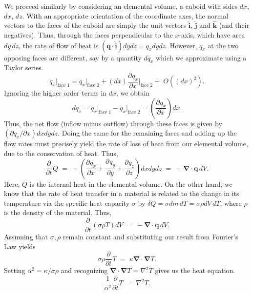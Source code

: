 \documentclass[10pt]{article}
\newcommand\ve[1]{\boldsymbol{#1}}
\newcommand\ppt[1]{\frac{\partial #1}{\partial t}}
\newcommand\pp[3][]{\frac{\partial^{#1}{#2}}{\partial {#3}^{#1}}}
\newcommand\grad[1]{\ve{\nabla}#1}
\newcommand\divg[1]{\ve{\nabla}\cdot#1}
\newcommand\lapl[1]{\nabla^2 #1}
\begin{document}
        We proceed similarly by considering an elemental volume, a cuboid with sides $dx$, $dx$, $dz$. With an appropriate orientation
        of the coordinate axes, the normal vectors to the faces of the cuboid are simply the unit vectors $\ve{\hat{i}}$, $\ve{\hat{j}}$
        and $\ve{\hat{k}}$ (and their negatives). Thus, through the faces perpendicular to the $x$-axis, which have area $dy\,dz$,
        the rate of flow of heat is $(\ve{q}\cdot\ve{\hat{i}})dydz = q_x dy dz$. However, $q_x$ at the two opposing faces are different,
        say by a quantity $dq_x$ which we approximate using a Taylor series.
        \[
                q_x\big|_{\text{face 1}} = q_x\big|_{\text{face 2}} + (dx)\pp{q_x}{x}\bigg|_{\text{face 2}} +\; O((dx)^2).
        \]
        Ignoring the higher order terms in $dx$, we obtain
        \[
                dq_x = q_x\big|_{\text{face 1}} - q_x\big|_{\text{face 2}} = \left(\pp{q_x}{x}\right)dx.
        \]
        Thus, the net flow (inflow minus outflow) through these faces is given by $(\partial q_x /\partial x)dxdydz$.
        Doing the same for the remaining faces and adding up the flow rates must precisely yield the rate of loss of heat from our elemental volume,
        due to the conservation of heat. Thus,
        \[
                \pp{}{t}Q \;=\; -\left(\pp{q_x}{x} + \pp{q_y}{y} + \pp{q_z}{z}\right)dx dy dz \;=\; -\divg{\ve{q}}\, dV.
        \]
        Here, $Q$ is the internal heat in the elemental volume. On the other hand, we know that the rate of heat transfer in a material is related to the
        change in its temperature via the specific heat capacity $\sigma$ by $\delta Q = \sigma d m\, dT = \sigma\rho dV\, dT$, where $\rho$
        is the density of the material. Thus,
        \[
                \pp{}{t}(\sigma \rho T) dV \;=\; -\divg{\ve{q}}\, dV.
        \]
        Assuming that $\sigma, \rho$ remain constant and substituting our result from Fourier's Law yields
        \[
                \sigma\rho\pp{}{t}T \;=\; \kappa\divg{\grad{T}}.
        \]
        Setting $\alpha^2 = \kappa /\sigma\rho$ and recognizing $\divg{\grad{T}} = \lapl{T}$ gives us the heat equation.
        \[
                \frac{1}{\alpha^2}\ppt{}T \;=\; \lapl{T}.
        \]
\end{document}
